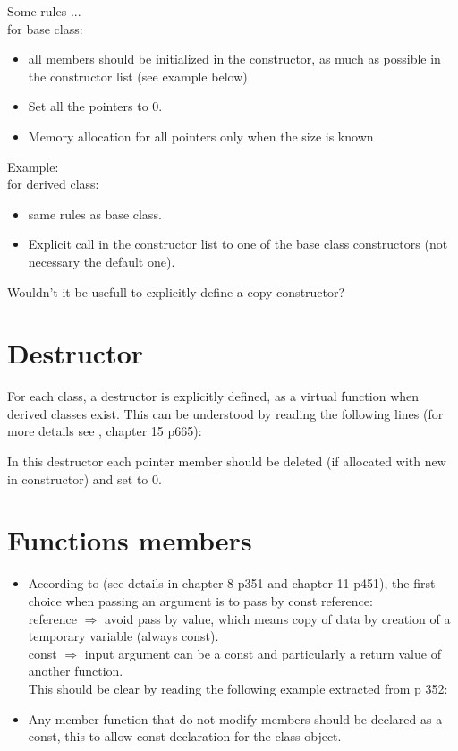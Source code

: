 Some rules ...\\
for base class: 
\begin{itemize}
\item all members should be initialized in the constructor, as much as possible in the constructor list (see example below) 
\item Set all the pointers to 0.
\item Memory allocation for all pointers only when the size is known
\end{itemize}
Example:\\

for derived class: 
\begin{itemize}
\item same rules as base class.
\item Explicit call in the constructor list to one of the base class constructors (not necessary the default one). 
\end{itemize}
\begin{ndr}
  Wouldn't it be usefull to explicitly define a copy constructor?
\end{ndr}


\section{Destructor}
For each class, a destructor is explicitly defined, as a virtual function when derived classes exist. This can be understood by reading the following lines (for more details see \cite{Eckel2000}, chapter 15 p665): 

In this destructor each pointer member should be deleted (if allocated with new in constructor) and set to 0. 
\section{Functions members}
\begin{itemize}
\item According to \cite{Eckel2000} (see details in chapter 8 p351 and chapter 11 p451), the first choice when passing an argument is to pass by const reference:\\
reference $\Rightarrow$ avoid pass by value, which means copy of data by creation of a temporary variable (always const). \\
const $\Rightarrow$ input argument can be a const and particularly a return value of another function. \\
This should be clear by reading the following example extracted from  \cite{Eckel2000} p 352: 

\item Any member function that do not modify members should be declared as a const, this to allow const declaration for the class object. 
\end{itemize}

